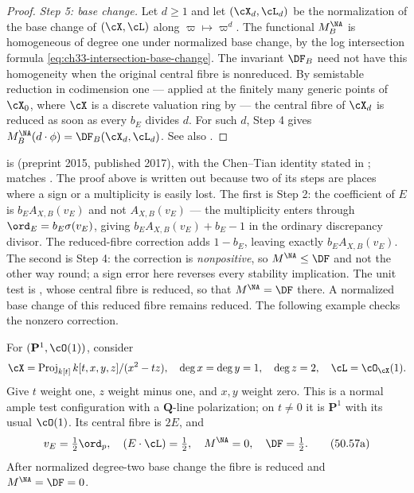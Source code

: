 \begin{proof}
\emph{Step 5: base change.}  Let $d\ge1$ and let $(\cX_d,\cL_d)$ be the
normalization of the base change of $(\cX,\cL)$ along
$\varpi\mapsto\varpi^d$.  The functional $M^{\NA}_B$ is homogeneous of degree one under
normalized base change, by the log intersection formula
\eqref{eq:ch33-intersection-base-change}.  The invariant $\DF_B$
need not have this homogeneity when the original central fibre is
nonreduced.  By semistable reduction in
codimension one --- applied at the finitely many generic points of
$\cX_0$, where $\cX$ is a discrete valuation ring by
 --- the central fibre of
$\cX_d$ is reduced as soon as every $b_E$ divides $d$.  For such
$d$, Step 4 gives $M^{\NA}_B(d\cdot\phi)=\DF_B(\cX_d,\cL_d)$.  See also
\cite[Propositions~7.15--7.16 and 7.22]{BHJ17}.
\end{proof}

\begin{remark}
\label{rem:ch50-chen-tian-provenance}
 is \cite[\S7]{BHJ17} (preprint 2015,
published 2017), with the Chen--Tian identity stated in
\cite[Proposition~7.22]{BHJ17};  matches
\cite[Definitions~7.13, 7.17 and 7.20]{BHJ17}.  The proof above is written
out because two of its steps are places where a sign or a multiplicity is
easily lost.  The first is Step 2: the coefficient of $E$ is
$b_EA_{X,B}(v_E)$ and not $A_{X,B}(v_E)$ --- the multiplicity enters
through $\ord_E=b_E\sigma(v_E)$, giving
$b_EA_{X,B}(v_E)+b_E-1$ in the ordinary discrepancy divisor.
The reduced-fibre correction adds $1-b_E$, leaving exactly
$b_EA_{X,B}(v_E)$.  The second is Step 4: the correction is
\emph{nonpositive}, so $M^{\NA}\le\DF$ and not the other way round; a
sign error here reverses every stability implication.  The unit test is
, whose central fibre is reduced, so that
$M^{\NA}=\DF$ there.  A normalized base change of this reduced fibre
remains reduced.  The following example checks the nonzero correction.
\end{remark}

\begin{example}
\label{ex:ch50-nonreduced-fibre}
For $(\mathbf P^1,\cO(1))$, consider
\[
 \cX=\operatorname{Proj}_{k[t]}k[t,x,y,z]/(x^2-tz),
 \quad \deg x=\deg y=1,\quad\deg z=2,
 \quad\cL=\cO_{\cX}(1).
\]
Give $t$ weight one, $z$ weight minus one, and $x,y$ weight zero.
This is a normal ample test configuration with a $\mathbf Q$-line
polarization; on $t\ne0$ it is $\mathbf P^1$ with its usual
$\cO(1)$.  Its central fibre is $2E$, and
\[
 v_E=\tfrac12\ord_p,\quad (E\cdot\cL)=\tfrac12,\quad
 M^{\NA}=0,\quad \DF=\tfrac12.
\tag{50.57a}\label{eq:ch50-nonreduced-numbers}
\]
After normalized degree-two base change the fibre is reduced and
$M^{\NA}=\DF=0$.
\end{example}

